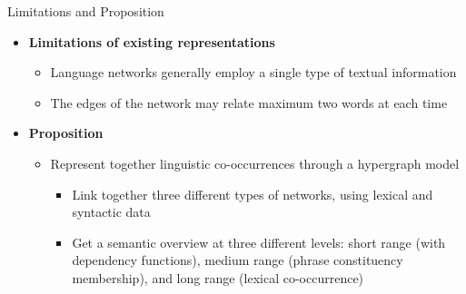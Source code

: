 \documentclass[10pt,xcolor=table]{beamer}
\begin{document}
\begin{frame}{Limitations and Proposition}
\begin{itemize}[<+- | alert@+>]
\item \textbf{Limitations of existing representations}
	\begin{itemize}
	\item Language networks generally employ a single type of textual information
	\item The edges of the network may relate maximum two words at each time
	\end{itemize}
\item \textbf{Proposition}
	\begin{itemize}
	\item Represent together linguistic co-occurrences through a hypergraph model
	\begin{itemize}
	\item Link together three different types of networks, using lexical and syntactic data
	\item Get a semantic overview at three different levels: short range (with dependency functions), medium range (phrase constituency membership), and long range (lexical  co-occurrence) 
	\end{itemize}
	
	\end{itemize}
\end{itemize}
\vspace{\textheight}
\end{frame}

%	
%
\end{document}

